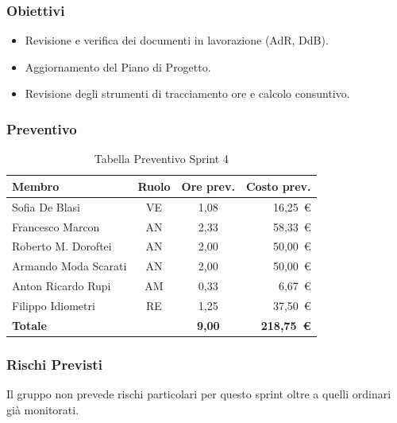 \subsubsection{Obiettivi}
\begin{itemize}
    \item Revisione e verifica dei documenti in lavorazione (AdR, DdB).
    \item Aggiornamento del Piano di Progetto.
    \item Revisione degli strumenti di tracciamento ore e calcolo consuntivo.
\end{itemize}

\subsubsection{Preventivo}
\begin{table}[H]
    \centering
    \renewcommand{\arraystretch}{1.3}
    \begin{tabularx}{\textwidth}{|X|c|c|r|}
        \hline
        \textbf{Membro} & \textbf{Ruolo} & \textbf{Ore prev.} & \textbf{Costo prev.} \\
        \hline
        Sofia De Blasi           & VE & 1,08 & 16{,}25~\euro \\
        Francesco Marcon         & AN & 2,33 & 58{,}33~\euro \\
        Roberto M. Doroftei      & AN & 2,00 & 50{,}00~\euro \\
        Armando Moda Scarati     & AN & 2,00 & 50{,}00~\euro \\
        Anton Ricardo Rupi       & AM & 0,33 & 6{,}67~\euro \\
        Filippo Idiometri        & RE & 1,25 & 37{,}50~\euro \\
        \hline
        \textbf{Totale} & & \textbf{9,00} & \textbf{218{,}75~\euro} \\
        \hline
    \end{tabularx}
    \caption{Tabella Preventivo Sprint 4}
\end{table}

\subsubsection{Rischi Previsti}
Il gruppo non prevede rischi particolari per questo sprint oltre a quelli ordinari già monitorati.


